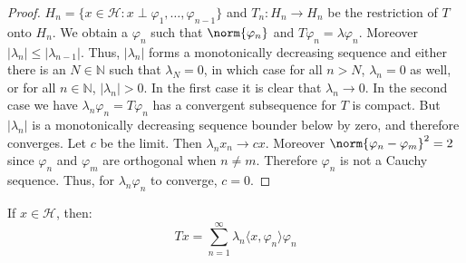 \begin{proof}
            $H_{n}=\{x\in\mathscr{H}:%
             x\perp\varphi_{1},\hdots,\varphi_{n-1}\}$
            and $T_{n}:H_{n}\rightarrow{H}_{n}$ be the
            restriction of $T$ onto $H_{n}$. We obtain a
            $\varphi_{n}$ such that
            $\norm{\varphi_{n}}$ and
            $T\varphi_{n}=\lambda\varphi_{n}$. Moreover
            $|\lambda_{n}|\leq|\lambda_{n-1}|$. Thus,
            $|\lambda_{n}|$ forms a monotonically
            decreasing sequence and either there is an
            $N\in\mathbb{N}$ such that
            $\lambda_{N}=0$, in which case for all $n>N$,
            $\lambda_{n}=0$ as well, or for all
            $n\in\mathbb{N}$, $|\lambda_{n}|>0$. In the first
            case it is clear that $\lambda_{n}\rightarrow{0}$.
            In the second case we have
            $\lambda_{n}\varphi_{n}=T\varphi_{n}$ has
            a convergent subsequence for $T$ is compact.
            But $|\lambda_{n}|$ is a monotonically
            decreasing sequence bounder below by zero,
            and therefore converges. Let $c$ be the limit.
            Then $\lambda_{n}x_{n}\rightarrow{cx}$.
            Moreover $\norm{\varphi_{n}-\varphi_{m}}^{2}=2$
            since $\varphi_{n}$ and $\varphi_{m}$ are
            orthogonal when $n\ne{m}$. Therefore
            $\varphi_{n}$ is not a Cauchy sequence. Thus,
            for $\lambda_{n}\varphi_{n}$ to converge,
            $c=0$.
        \end{proof}
        \begin{theorem}
            If $x\in\mathscr{H}$, then:
            \begin{equation*}
                Tx=\sum_{n=1}^{\infty}
                    \lambda_{n}\langle{x},\varphi_{n}\rangle
                    \varphi_{n}
            \end{equation*}
        \end{theorem}
